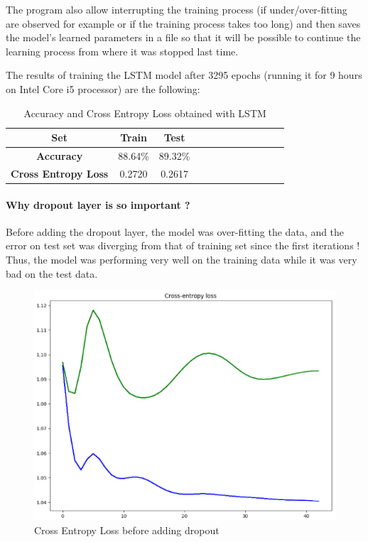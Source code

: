 \documentclass[a4paper,english,12pt]{article}
\begin{document}
The program also allow interrupting the training process (if under/over-fitting are observed for example or if the training process takes too long) and then saves the model's learned parameters in a file so that it will be possible to continue the learning process from where it was stopped last time.

The results of training the LSTM model after 3295 epochs (running it for 9 hours on Intel Core i5 processor) are the following:

\begin{table}[H]\centering
	\begin{tabular}{cccccccccccc}
		\toprule
		\textbf{Set} & Train & Test \\    \midrule
		\textbf{Accuracy} & 88.64\% & 89.32\% \\   
		\textbf{Cross Entropy Loss} & 0.2720 & 0.2617\\
		\bottomrule	
	\end{tabular}
	\caption{Accuracy and Cross Entropy Loss obtained with LSTM }
\end{table}


\paragraph{Why dropout layer is so important ?}
Before adding the dropout layer, the model was over-fitting the data, and the error on test set was diverging from that of training set since the first iterations ! Thus, the model was performing very well on the training data while it was very bad on the test data.

\begin{figure}[H]
	\centering
	\includegraphics[scale=1]{overfitting}
	\caption{Cross Entropy Loss before adding dropout}
\end{figure}
\end{document}
